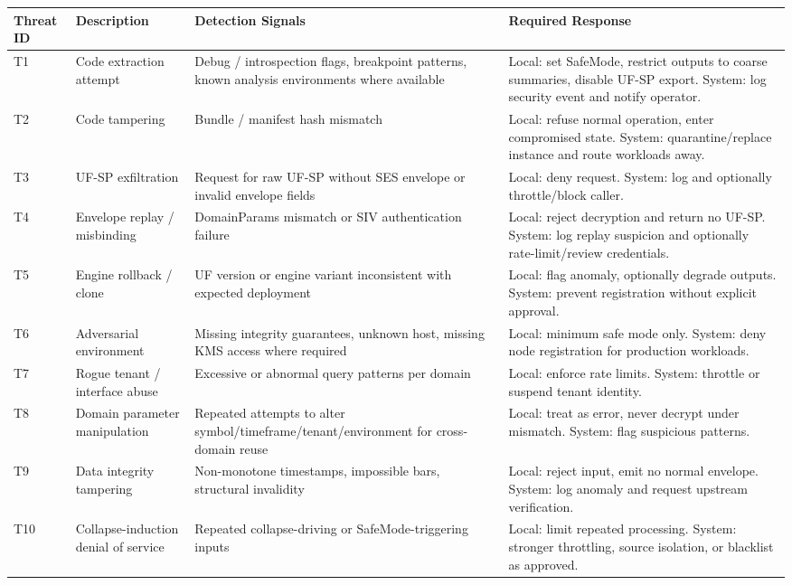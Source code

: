 \documentclass[11pt]{report}
\begin{document}
\renewcommand{\arraystretch}{1.15}
\begin{longtable}{p{}p{}p{}p{}}
\toprule
Threat ID & Description & Detection Signals & Required Response \\
\midrule
T1 & Code extraction attempt & Debug / introspection flags, breakpoint patterns, known analysis environments where available & Local: set SafeMode, restrict outputs to coarse summaries, disable UF-SP export. System: log security event and notify operator. \\
T2 & Code tampering & Bundle / manifest hash mismatch & Local: refuse normal operation, enter compromised state. System: quarantine/replace instance and route workloads away. \\
T3 & UF-SP exfiltration & Request for raw UF-SP without SES envelope or invalid envelope fields & Local: deny request. System: log and optionally throttle/block caller. \\
T4 & Envelope replay / misbinding & DomainParams mismatch or SIV authentication failure & Local: reject decryption and return no UF-SP. System: log replay suspicion and optionally rate-limit/review credentials. \\
T5 & Engine rollback / clone & UF version or engine variant inconsistent with expected deployment & Local: flag anomaly, optionally degrade outputs. System: prevent registration without explicit approval. \\
T6 & Adversarial environment & Missing integrity guarantees, unknown host, missing KMS access where required & Local: minimum safe mode only. System: deny node registration for production workloads. \\
T7 & Rogue tenant / interface abuse & Excessive or abnormal query patterns per domain & Local: enforce rate limits. System: throttle or suspend tenant identity. \\
T8 & Domain parameter manipulation & Repeated attempts to alter symbol/timeframe/tenant/environment for cross-domain reuse & Local: treat as error, never decrypt under mismatch. System: flag suspicious patterns. \\
T9 & Data integrity tampering & Non-monotone timestamps, impossible bars, structural invalidity & Local: reject input, emit no normal envelope. System: log anomaly and request upstream verification. \\
T10 & Collapse-induction denial of service & Repeated collapse-driving or SafeMode-triggering inputs & Local: limit repeated processing. System: stronger throttling, source isolation, or blacklist as approved. \\
\bottomrule
\end{longtable}
\end{document}
